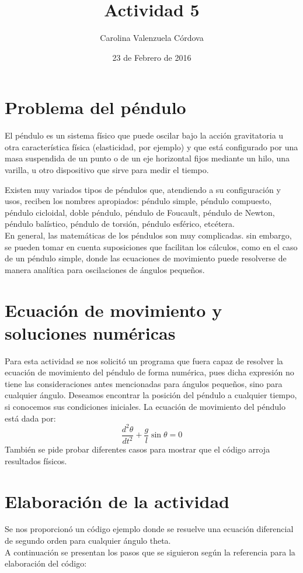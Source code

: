 \documentclass[12 pt,twocolumn]{article}
\begin{document}
\title{Actividad 5}
\author{Carolina Valenzuela Córdova}
\date{23 de Febrero de 2016}
\maketitle
\newpage

\section{\small Problema del péndulo}
El péndulo es un sistema físico que puede oscilar bajo la acción gravitatoria u otra característica física (elasticidad, por ejemplo) y que está configurado por una masa suspendida de un punto o de un eje horizontal fijos mediante un hilo, una varilla, u otro dispositivo que sirve para medir el tiempo.

Existen muy variados tipos de péndulos que, atendiendo a su configuración y usos, reciben los nombres apropiados: péndulo simple, péndulo compuesto, péndulo cicloidal, doble péndulo, péndulo de Foucault, péndulo de Newton, péndulo balístico, péndulo de torsión, péndulo esférico, etcétera.\cite{w}\\
En general, las matemáticas de los péndulos son muy complicadas. sin embargo, se pueden tomar en cuenta suposiciones que facilitan los cálculos, como en el caso de un péndulo simple, donde las ecuaciones de movimiento puede resolverse de manera analítica para oscilaciones de ángulos pequeños.

\section{\small Ecuación de movimiento y soluciones numéricas}

Para esta actividad se nos solicitó un programa que fuera capaz de resolver la ecuación de movimiento del péndulo de forma numérica, pues dicha expresión no tiene las consideraciones antes mencionadas para ángulos pequeños, sino para cualquier ángulo. Deseamos encontrar la posición del péndulo a cualquier tiempo, si conocemos sus condiciones iniciales.
La ecuación de movimiento del péndulo está dada por: $$\frac{d^2\theta}{dt^2}+\frac{g}{l}\sin{\theta}=0$$
También se pide probar diferentes casos para mostrar que el código arroja resultados físicos.

\section{\small Elaboración de la actividad}
Se nos proporcionó un código ejemplo donde se resuelve una ecuación diferencial de segundo orden para cualquier ángulo theta.\\
A continuación se presentan los pasos que se siguieron según la referencia\cite{s} para la elaboración del código:
\end{document}
